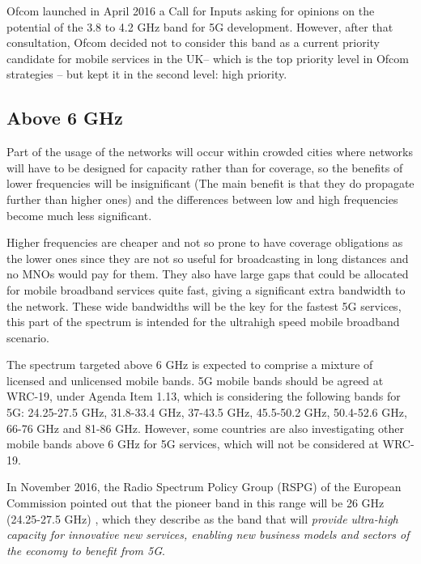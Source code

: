 Ofcom launched in April 2016 a Call for Inputs \cite{1-24} asking for opinions on the potential of the 3.8 to 4.2 GHz band for 5G development. However, after that consultation, Ofcom decided not to consider this band as a current priority \cite{1-25} candidate for mobile services in the UK– which is the top priority level in Ofcom strategies – but kept it in the second level: \guillemotleft high priority\guillemotright  \cite{1-26}. \par

\subsection*{Above 6 GHz}
Part of the usage of the networks will occur within crowded cities where networks will have to be designed for capacity rather than for coverage, so the benefits of lower frequencies will be insignificant (The main benefit is that they do propagate further than higher ones) and the differences between low and high frequencies become much less significant.\par

Higher frequencies are cheaper and not so prone to have coverage obligations as the lower ones since they are not so useful for broadcasting in long distances and no MNOs would pay for them. They also have large gaps that could be allocated for mobile broadband services quite fast, giving a significant extra bandwidth to the network. These wide bandwidths will be the key for the fastest 5G services, this part of the spectrum is intended for the ultrahigh speed mobile broadband scenario. \par

The spectrum targeted above 6 GHz is expected to comprise a mixture of licensed and unlicensed mobile bands. 5G mobile bands should be agreed at WRC-19, under Agenda Item 1.13, \cite{1-27} which is considering the following bands for 5G: 24.25-27.5 GHz, 31.8-33.4 GHz, 37-43.5 GHz, 45.5-50.2 GHz, 50.4-52.6 GHz, 66-76 GHz and 81-86 GHz. However, some countries are also investigating other mobile bands above 6 GHz for 5G services, which will not be considered at WRC-19.\par

In November 2016, the Radio Spectrum Policy Group (RSPG) of the European Commission pointed out that the pioneer band in this range will be 26 GHz (24.25-27.5 GHz) \cite{1-23}, which they describe as the band that will \guillemotleft \textit{provide ultra-high capacity for innovative new services, enabling new business models and sectors of the economy to benefit from 5G}\guillemotright .\par

